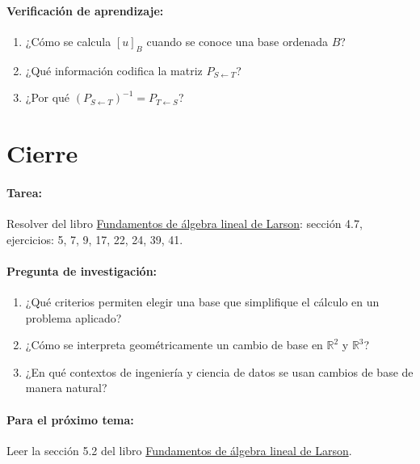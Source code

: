 \documentclass[a4,11pt]{aleph-notas}
\begin{document}
\paragraph{Verificación de aprendizaje:}
\begin{enumerate}[leftmargin=*]
    \item ¿Cómo se calcula $[u]_B$ cuando se conoce una base ordenada $B$?
    \item ¿Qué información codifica la matriz $P_{S\gets T}$?
    \item ¿Por qué $(P_{S\gets T})^{-1}=P_{T\gets S}$?
\end{enumerate}

\section*{Cierre}

\paragraph{Tarea:}
Resolver del libro \href{https://catalogobiblioteca.puce.edu.ec/cgi-bin/koha/opac-detail.pl?biblionumber=86081}{Fundamentos de álgebra lineal de Larson}: sección 4.7, ejercicios: 5, 7, 9, 17, 22, 24, 39, 41.

\paragraph{Pregunta de investigación:}
\begin{enumerate}[leftmargin=*]
    \item ¿Qué criterios permiten elegir una base que simplifique el cálculo en un problema aplicado?
    \item ¿Cómo se interpreta geométricamente un cambio de base en $\mathbb{R}^2$ y $\mathbb{R}^3$?
    \item ¿En qué contextos de ingeniería y ciencia de datos se usan cambios de base de manera natural?
\end{enumerate}

\paragraph{Para el próximo tema:}  
Leer la sección 5.2 del libro \href{https://catalogobiblioteca.puce.edu.ec/cgi-bin/koha/opac-detail.pl?biblionumber=86081}{Fundamentos de álgebra lineal de Larson}.
\end{document}
